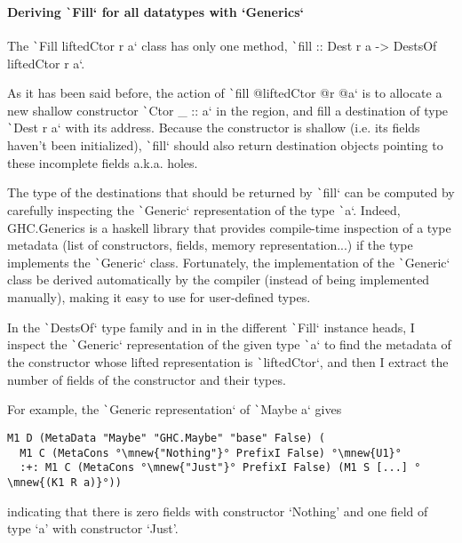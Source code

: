 \documentclass[english]{jflart}
\begin{document}
\paragraph{Deriving \texttt`Fill` for all datatypes with `Generics`}

The \texttt`Fill liftedCtor r a` class has only one method, \texttt`fill :: Dest r a -> DestsOf liftedCtor r a`.

As it has been said before, the action of \texttt`fill @liftedCtor @r @a` is to allocate a new shallow constructor \texttt`Ctor _ :: a` in the region, and fill a destination of type \texttt`Dest r a` with its address. Because the constructor is shallow (i.e. its fields haven't been initialized), \texttt`fill` should also return destination objects pointing to these incomplete fields a.k.a. holes.

The type of the destinations that should be returned by \texttt`fill` can be computed by carefully inspecting the \texttt`Generic` representation of the type \texttt`a`. Indeed, GHC.Generics is a haskell library that provides compile-time inspection of a type metadata (list of constructors, fields, memory representation...) if the type implements the \texttt`Generic` class. Fortunately, the implementation of the \texttt`Generic` class be derived automatically by the compiler (instead of being implemented manually), making it easy to use for user-defined types.

In the \texttt`DestsOf` type family and in in the different \texttt`Fill` instance heads, I inspect the \texttt`Generic` representation of the given type \texttt`a` to find the metadata of the constructor whose lifted representation is \texttt`liftedCtor`, and then I extract the number of fields of the constructor and their types.

For example, the \texttt`Generic representation` of \texttt`Maybe a` gives

\begin{verbatim}
M1 D (MetaData "Maybe" "GHC.Maybe" "base" False) (
  M1 C (MetaCons °\mnew{"Nothing"}° PrefixI False) °\mnew{U1}°
  :+: M1 C (MetaCons °\mnew{"Just"}° PrefixI False) (M1 S [...] °\mnew{(K1 R a)}°))
\end{verbatim}

indicating that there is zero fields with constructor `Nothing' and one field of type `a' with constructor `Just'. 
\end{document}
